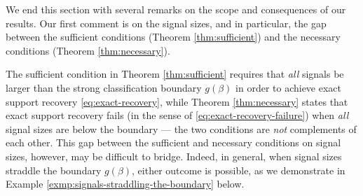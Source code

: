 We end this section with several remarks on the scope and consequences
of our results. Our first comment is on the signal sizes, and in particular, the gap 
between the sufficient conditions (Theorem \ref{thm:sufficient}) and the necessary 
conditions (Theorem \ref{thm:necessary}).

\begin{remark} \label{rmk:gap-between-sufficient-necessary}
The sufficient condition in Theorem \ref{thm:sufficient} requires that \emph{all} signals be larger than the strong classification boundary $g(\beta)$ in order to achieve exact support recovery \eqref{eq:exact-recovery}, while Theorem \ref{thm:necessary} states that exact support recovery fails (in the sense of \eqref{eq:exact-recovery-failure}) when \emph{all} signal sizes are below the boundary --- the two conditions are \emph{not} complements of each other.
This gap between the sufficient and necessary conditions on signal sizes, however, may be difficult to bridge.
Indeed, in general, when signal sizes straddle the boundary $g(\beta)$, either outcome is possible, as we demonstrate in 
Example \ref{exmp:signals-straddling-the-boundary} below.
\end{remark}

